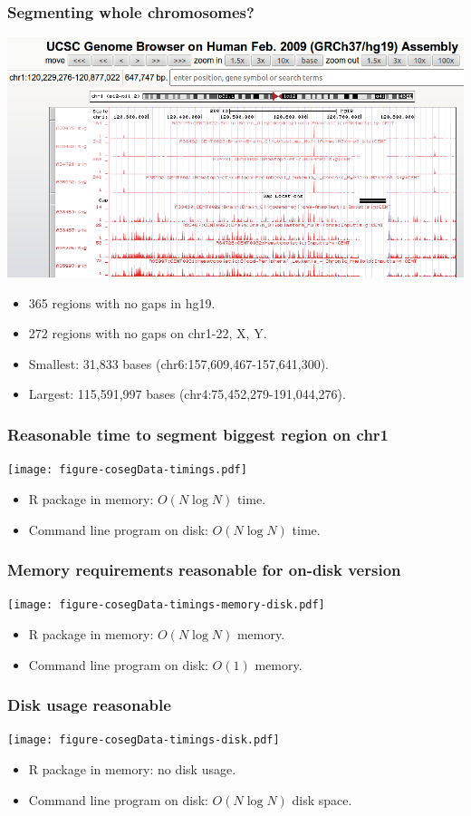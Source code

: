 \documentclass{beamer}
\begin{document}
\begin{frame}
  \frametitle{Segmenting whole chromosomes?}
  \includegraphics[width=\textwidth]{screenshot-gap-peaks}
  \begin{itemize}
  \item 365 regions with no gaps in hg19.
  \item 272 regions with no gaps on chr1-22, X, Y.
  \item Smallest: 31,833 bases (chr6:157,609,467-157,641,300).
  \item Largest: 115,591,997 bases (chr4:75,452,279-191,044,276).
  \end{itemize}
\end{frame}


\begin{frame}
  \frametitle{Reasonable time to segment biggest region on chr1}
  \texttt{[image: figure-cosegData-timings.pdf]}
  \begin{itemize}
  \item R package in memory: $O(N \log N)$ time.
  \item Command line program on disk: $O(N \log N)$ time.
  \end{itemize}
\end{frame}

\begin{frame}
  \frametitle{Memory requirements reasonable for on-disk version}
  \texttt{[image: figure-cosegData-timings-memory-disk.pdf]}
  \begin{itemize}
  \item R package in memory: $O(N \log N)$ memory.
  \item Command line program on disk: $O(1)$ memory.
  \end{itemize}
\end{frame}

\begin{frame}
  \frametitle{Disk usage reasonable}
  \texttt{[image: figure-cosegData-timings-disk.pdf]}
  \begin{itemize}
  \item R package in memory: no disk usage.
  \item Command line program on disk: $O(N \log N)$ disk space.
  \end{itemize}
\end{frame}
\end{document}
